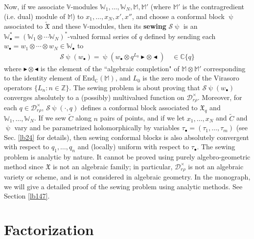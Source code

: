 \documentclass[12pt,b5paper,notitlepage]{report}
\theoremstyle{definition}
\theoremstyle{plain}
\newcommand{\fk}{\mathfrak}
\newcommand{\mc}{\mathcal}
\newcommand{\wtd}{\widetilde}
\newcommand{\End}{\mathrm{End}} %
\newcommand{\blt}{\bullet}
\newcommand{\Vbb}{\mathbb V}
\newcommand{\Wbb}{\mathbb W}
\newcommand{\Mbb}{\mathbb M}
\newcommand{\Cbb}{\mathbb C}
\newcommand{\Zbb}{\mathbb Z}
\newcommand{\btl}{\blacktriangleleft}
\newcommand{\btr}{\blacktriangleright}
\numberwithin{equation}{section}
\begin{document}
Now, if we associate $\Vbb$-modules $\Wbb_1,\dots,\Wbb_N,\Mbb,\Mbb'$ (where $\Mbb'$ is the contragredient (i.e. dual) module of $\Mbb$) to $x_1,\dots,x_N,x',x''$, and choose a conformal block $\uppsi$ associated to $\wtd{\fk X}$ and these $\Vbb$-modules, then its \textbf{sewing} $\mc S\uppsi$ is an $\Wbb_\blt^*=(\Wbb_1\otimes\cdots\Wbb_N)^*$-valued formal series of $q$ defined by sending each $w_\blt=w_1\otimes\cdots\otimes w_N\in\Wbb_\blt$ to
\begin{align*}
\mc S\uppsi(w_\blt)=\uppsi(w_\blt\otimes q^{L_0}\btr\otimes\btl)\quad\in\Cbb\{q\}
\end{align*}
where $\btr\otimes\btl$ is the element of the ``algebraic completion" of $\Mbb\otimes\Mbb'$ corresponding to the identity element of $\End_\Cbb(\Mbb)$, and $L_0$ is the zero mode of the Virasoro operators $\{L_n:n\in\Zbb\}$. The sewing problem is about proving that $\mc S\uppsi(w_\blt)$ converges absolutely to a (possibly) multivalued function on $\mc D_{r\rho}^\times$. Moreover, for each $q\in\mc D_{r\rho}^\times$, $\mc S\uppsi(\cdot,q)$ defines a conformal block associated to $\fk X_q$ and $\Wbb_1,\dots,\Wbb_N$. If we sew $\wtd C$ along $n$ pairs of points, and if we let  $x_1,\dots,x_N$ and  $\wtd C$ and $\uppsi$    vary and be parametrized holomorphically by variables $\tau_\blt=(\tau_1,\dots,\tau_m)$ (see Sec. \ref{lb24} for details), then  sewing  conformal blocks is also absolutely  convergent with respect to $q_1,\dots,q_n$ and (locally) uniform with respect to $\tau_\blt$. 	The sewing problem is analytic by nature. It cannot be proved using purely algebro-geometric method since $\fk X$ is not an algebraic family; in particular, $\mc D_{r\rho}^\times$ is not an algebraic variety or scheme, and is not considered in algebraic geometry. In the monograph, we will give a detailed proof of the  sewing problem using analytic methods. See Section \ref{lb147}.
	

	



\section*{Factorization}
\end{document}
